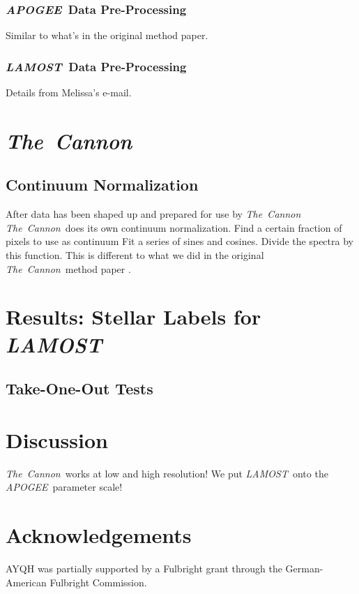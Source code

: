 \documentclass[12pt, preprint]{aastex}
\newcommand{\tc}{\textsl{The~Cannon}}
\newcommand{\apogee}{\textsl{APOGEE}}
\newcommand{\lamost}{\textsl{LAMOST}}
\begin{document}
\subsubsection{\apogee\ Data Pre-Processing}

Similar to what's in the original method paper.

\subsubsection{\lamost\ Data Pre-Processing}

Details from Melissa's e-mail.

\section{\tc}


\subsection{Continuum Normalization}

After data has been shaped up and prepared for use by \tc\, \tc\ does its own
continuum normalization. Find a certain fraction of pixels to use as continuum
Fit a series of sines and cosines. Divide the spectra by this function. This 
is different to what we did in the original \tc\ method paper \citep{ness2015}. 


\section{Results: Stellar Labels for \lamost}

\subsection{Take-One-Out Tests}

\section{Discussion}

\tc\ works at low and high resolution! We put \lamost\ onto the \apogee\ 
parameter scale!

\section{Acknowledgements}

AYQH was partially supported by a Fulbright grant through the German-American
Fulbright Commission.
\end{document}
